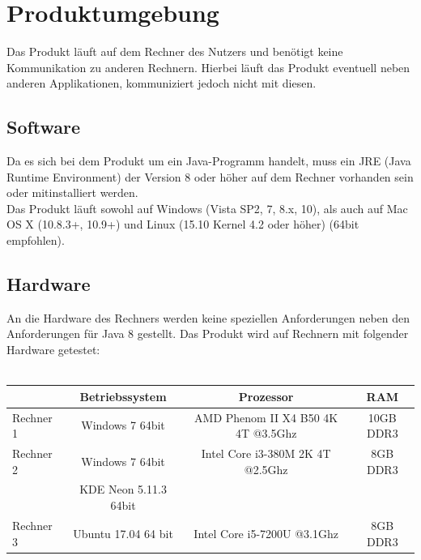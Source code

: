 \documentclass[parskip=full]{scrartcl}
\let\glsplgen\glsuseri
\begin{document}

 

\section{Produktumgebung}
Das Produkt läuft auf dem Rechner des Nutzers und benötigt keine Kommunikation zu anderen Rechnern. Hierbei läuft das Produkt eventuell neben anderen Applikationen, kommuniziert jedoch nicht mit diesen.

\subsection{Software}
Da es sich bei dem Produkt um ein Java-Programm handelt, muss ein JRE (Java Runtime Environment) der Version 8 oder höher auf dem Rechner vorhanden sein oder mitinstalliert werden. \\
Das Produkt läuft sowohl auf Windows (Vista SP2, 7, 8.x, 10), als auch auf Mac OS X (10.8.3+, 10.9+) und Linux (15.10 Kernel 4.2 oder höher) (64bit empfohlen).

\subsection{Hardware}
An die Hardware des Rechners werden keine speziellen Anforderungen neben den Anforderungen für Java 8 gestellt. Das Produkt wird auf Rechnern mit folgender Hardware getestet: \\ \\
\begin{tabular}{l||c|c|c}
   	& Betriebssystem & Prozessor & RAM \\
	\hline
	\hline
	Rechner 1 & Windows 7 64bit & AMD Phenom II X4 B50 4K 4T @3.5Ghz & 10GB DDR3 \\
	Rechner 2 & Windows 7 64bit & Intel Core i3-380M 2K 4T @2.5Ghz & 8GB DDR3 \\
	 & KDE Neon 5.11.3 64bit &  \\
	Rechner 3 & Ubuntu 17.04 64 bit & Intel Core i5-7200U @3.1Ghz & 8GB DDR3 \\
\end{tabular}
\end{document}
